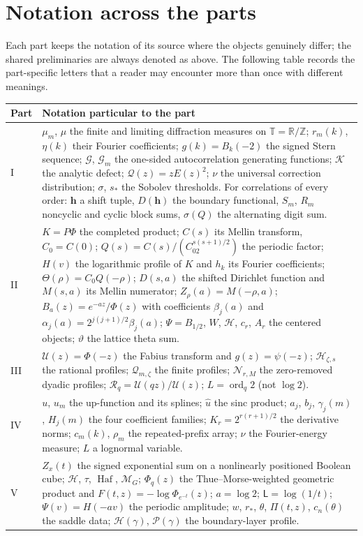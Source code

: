 \documentclass[11pt,a4paper,oneside,openany]{book}
\numberwithin{equation}{chapter}
\theoremstyle{definition}
\theoremstyle{remark}
\newcommand{\T}{\mathbb T}
\newcommand{\Z}{\mathbb Z}
\newcommand{\R}{\mathbb R}
\DeclareMathOperator{\ord}{ord}
\DeclareMathOperator{\Haf}{Haf}
\newcommand{\calH}{\mathcal H}
\newcommand{\Up}{\mathcal U}
\newcommand{\Rp}{\mathcal R}
\newcommand{\Hp}{\mathcal H}
\newcommand{\Qp}{\mathcal Q}
\newcommand{\Np}{\mathcal N}
\newcommand{\HH}{\mathcal H}
\newcommand{\MM}{\mathcal M}
\newcommand{\Lsad}{\mathsf L}
\begin{document}
\section{Notation across the parts}
\label{sec:dictionary}
Each part keeps the notation of its source where the objects genuinely
differ; the shared preliminaries are always denoted as above. The following
table records the part-specific letters that a reader may encounter more
than once with different meanings.
\begin{center}\small
\begin{tabularx}{\textwidth}{@{}lX@{}}
\toprule
Part & Notation particular to the part\\
\midrule
I & $\mu_m$, $\mu$ the finite and limiting diffraction measures on
$\T=\R/\Z$; $r_m(k)$, $\eta(k)$ their Fourier coefficients; $g(k)=B_k(-2)$ the
signed Stern sequence; $\mathcal G$, $\mathcal G_m$ the one-sided
autocorrelation generating functions; $\mathcal K$ the analytic defect;
$\mathcal Q(z)=zE(z)^2$; $\nu$ the universal correction distribution;
$\sigma$, $s_*$ the Sobolev thresholds. For correlations of every order:
$\bm h$ a shift tuple, $D(\bm h)$ the boundary functional, $S_m$, $R_m$
noncyclic and cyclic block sums, $\sigma(Q)$ the alternating digit sum.\\
II & $K=P\Phi$ the completed product; $C(s)$ its Mellin transform,
$C_0=C(0)$; $Q(s)=C(s)/(C_02^{s(s+1)/2})$ the periodic factor; $H(v)$ the
logarithmic profile of $K$ and $h_k$ its Fourier coefficients;
$\Theta(\rho)=C_0Q(-\rho)$; $D(s,a)$ the shifted Dirichlet function and
$M(s,a)$ its Mellin numerator; $Z_\rho(a)=M(-\rho,a)$; $B_a(z)=e^{-az}/\Phi(z)$
with coefficients $\beta_j(a)$ and $\alpha_j(a)=2^{j(j+1)/2}\beta_j(a)$;
$\Psi=B_{1/2}$, $W$, $\calH$, $c_r$, $A_r$ the centered objects; $\vartheta$
the lattice theta sum.\\
III & $\Up(z)=\Phi(-z)$ the Fabius transform and $g(z)=\psi(-z)$;
$\Hp_{\zeta,s}$ the rational profiles; $\Qp_{m,\zeta}$ the finite profiles;
$\Np_{r,M}$ the zero-removed dyadic profiles; $\Rp_q=\Up(qz)/\Up(z)$;
$L=\ord_q2$ (not $\log2$).\\
IV & $u$, $u_m$ the up-function and its splines; $\widehat u$ the sinc product;
$a_j$, $b_j$, $\gamma_j(m)$, $H_j(m)$ the four coefficient families;
$K_r=2^{r(r+1)/2}$ the derivative norms; $c_m(k)$, $\rho_m$ the repeated-prefix
array; $\nu$ the Fourier-energy measure; $L$ a lognormal variable.\\
V & $Z_x(t)$ the signed exponential sum on a nonlinearly positioned Boolean
cube; $\HH$, $\tau$, $\Haf$, $\MM_G$; $\Phi_q(z)$ the Thue--Morse-weighted
geometric product and $F(t,z)=-\log\Phi_{e^{-t}}(z)$; $a=\log2$;
$\Lsad=\log(1/t)$; $\Psi(v)=H(-av)$ the periodic amplitude; $w$, $r_*$,
$\theta$, $\Pi(t,z)$, $c_n(\theta)$ the saddle data; $\mathcal H(\gamma)$,
$\mathcal P(\gamma)$ the boundary-layer profile.\\
\bottomrule
\end{tabularx}
\end{center}
\end{document}
